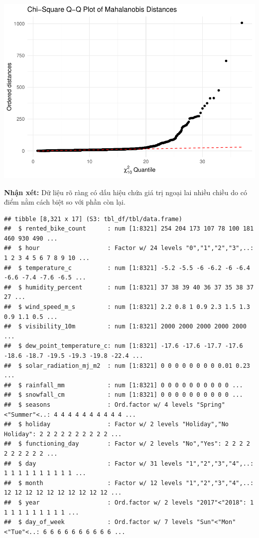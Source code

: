 \documentclass[
  11pt,
  letterpaper,
]{article}
\begin{document}
\begin{center}\includegraphics[width=1.2\linewidth,]{Final_Project_files/figure-latex/Multivariate Outlier check-1} \end{center}

\textbf{Nhận xét:} Dữ liệu rõ ràng có dấu hiệu chứa giá trị ngoại lai nhiều chiều do có điểm nằm cách biệt so với phần còn lại.

\begin{verbatim}
## tibble [8,321 x 17] (S3: tbl_df/tbl/data.frame)
##  $ rented_bike_count      : num [1:8321] 254 204 173 107 78 100 181 460 930 490 ...
##  $ hour                   : Factor w/ 24 levels "0","1","2","3",..: 1 2 3 4 5 6 7 8 9 10 ...
##  $ temperature_c          : num [1:8321] -5.2 -5.5 -6 -6.2 -6 -6.4 -6.6 -7.4 -7.6 -6.5 ...
##  $ humidity_percent       : num [1:8321] 37 38 39 40 36 37 35 38 37 27 ...
##  $ wind_speed_m_s         : num [1:8321] 2.2 0.8 1 0.9 2.3 1.5 1.3 0.9 1.1 0.5 ...
##  $ visibility_10m         : num [1:8321] 2000 2000 2000 2000 2000 ...
##  $ dew_point_temperature_c: num [1:8321] -17.6 -17.6 -17.7 -17.6 -18.6 -18.7 -19.5 -19.3 -19.8 -22.4 ...
##  $ solar_radiation_mj_m2  : num [1:8321] 0 0 0 0 0 0 0 0 0.01 0.23 ...
##  $ rainfall_mm            : num [1:8321] 0 0 0 0 0 0 0 0 0 0 ...
##  $ snowfall_cm            : num [1:8321] 0 0 0 0 0 0 0 0 0 0 ...
##  $ seasons                : Ord.factor w/ 4 levels "Spring"<"Summer"<..: 4 4 4 4 4 4 4 4 4 4 ...
##  $ holiday                : Factor w/ 2 levels "Holiday","No Holiday": 2 2 2 2 2 2 2 2 2 2 ...
##  $ functioning_day        : Factor w/ 2 levels "No","Yes": 2 2 2 2 2 2 2 2 2 2 ...
##  $ day                    : Factor w/ 31 levels "1","2","3","4",..: 1 1 1 1 1 1 1 1 1 1 ...
##  $ month                  : Factor w/ 12 levels "1","2","3","4",..: 12 12 12 12 12 12 12 12 12 12 ...
##  $ year                   : Ord.factor w/ 2 levels "2017"<"2018": 1 1 1 1 1 1 1 1 1 1 ...
##  $ day_of_week            : Ord.factor w/ 7 levels "Sun"<"Mon"<"Tue"<..: 6 6 6 6 6 6 6 6 6 6 ...
\end{verbatim}
\end{document}

